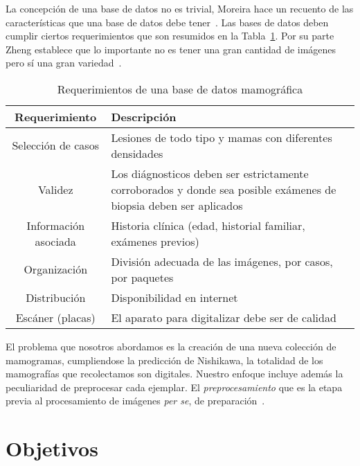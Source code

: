 La concepción de una base de datos no es trivial, Moreira hace un recuento de
las características que una base de datos debe
tener~\cite{moreira2012compliance}. Las bases de datos deben cumplir ciertos
requerimientos que son resumidos en la Tabla~\ref{features}. Por su parte Zheng
establece que lo importante no es tener una gran cantidad de imágenes pero sí
una gran variedad~\cite{zheng2010computer}.

\begin{table}
  \caption[Requerimientos de una base de datos mamográfica]{Requerimientos de una base de datos mamográfica}
  \label{features}
\begin{center}
{\small
    \begin{tabular}{c | >{\arraybackslash}m{3.5in}}
    \hline
    {\bf Requerimiento} &
    {\bf Descripción} \\
    \hline
    Selección de casos   & Lesiones de todo tipo y mamas con diferentes densidades\\
    Validez              & Los diágnosticos deben ser estrictamente corroborados
                           y donde sea posible exámenes de biopsia deben ser aplicados\\
    Información asociada & Historia clínica (edad, historial familiar, exámenes previos)\\
    Organización         & División adecuada de las imágenes, por casos, por paquetes\\
    Distribución         & Disponibilidad en internet\\
    Escáner (placas)     & El aparato para digitalizar debe ser de calidad\\
    \hline
    \end{tabular}
}
\end{center}
\end{table}

El problema que nosotros abordamos es la creación de una nueva colección de
mamogramas, cumpliendose la predicción de Nishikawa, la totalidad de los
mamografías que recolectamos son digitales. Nuestro enfoque incluye además la
peculiaridad de preprocesar cada ejemplar. El \textit{preprocesamiento} que es
la etapa previa al procesamiento de imágenes \textit{per se}, de
preparación~\cite{ponraj2011survey}.

\section{Objetivos}

